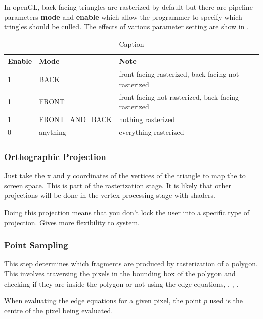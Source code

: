 In openGL, back facing triangles are rasterized by default but there are pipeline parameters \textbf{mode} and \textbf{enable} which allow the programmer to specify which tringles should be culled. The effects of various parameter setting are show in .
\begin{table}[ht]
    \begin{tabular}{|l|l|l|}
    \hline
    Enable & Mode             & Note                                                \\ \hline
    1      & BACK             & front facing rasterized, back facing not rasterized \\ \hline
    1      & FRONT            & front facing not rasterized, back facing rasterized \\ \hline
    1      & FRONT\_AND\_BACK & nothing rasterized                                  \\ \hline
    0      & anything         & everything rasterized                               \\ \hline
    \end{tabular}
    \caption{Caption}
    \label{table:faceCullingModes}
\end{table}

\subsubsection{Orthographic Projection}
Just take the x and y coordinates of the vertices of the triangle to map the to screen space. This is part of the rasterization stage. It is likely that other projections will be done in the vertex processing stage with shaders.

Doing this projection means that you don't lock the user into a specific type of projection. Gives more flexibility to system.

\subsubsection{Point Sampling}
This step determines which fragments are produced by rasterization of a polygon. This involves traversing the pixels in the bounding box of the polygon and checking if they are inside the polygon or not using the edge equations, , , .

When evaluating the edge equations for a given pixel, the point $p$ used is the centre of the pixel being evaluated.

